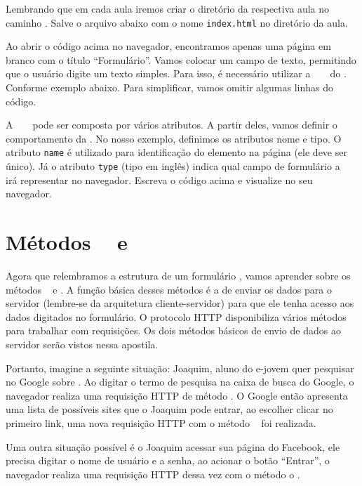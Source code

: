 

Lembrando que em cada aula iremos criar o diretório da respectiva aula no caminho
. Salve o arquivo abaixo com o nome \texttt{index.html} no
diretório da aula.



Ao abrir o código acima no navegador, encontramos apenas uma página em branco com o 
título ``Formulário''. Vamos colocar um campo de texto, permitindo que o usuário digite 
um texto simples. Para isso, é necessário utilizar a \tag~ \taginput~ do \html. Conforme 
exemplo abaixo. Para simplificar, vamos omitir algumas linhas do código.



A \tag~ \taginput~ pode ser composta por vários atributos. A partir deles, vamos definir o 
comportamento da \tag. No nosso exemplo, definimos os atributos nome e tipo. O atributo
\texttt{name} é utilizado para identificação do elemento na página (ele deve ser único). 
Já o atributo \texttt{type} (tipo em inglês) indica qual campo de formulário a \tag~ \taginput 
irá representar no navegador. Escreva o código acima e visualize no seu navegador.

\section{Métodos \metodoGET~ e \metodoPOST}
Agora que relembramos a estrutura de um formulário \html, vamos aprender sobre os métodos
\metodoGET~ e \metodoPOST. A função básica desses métodos é a de enviar os dados para 
o servidor (lembre-se da arquitetura cliente-servidor) para que ele tenha acesso aos 
dados digitados no formulário. O protocolo HTTP disponibiliza vários métodos para 
trabalhar com requisições. Os dois métodos básicos de envio de dados ao servidor serão 
vistos nessa apostila.

Portanto, imagine a seguinte situação: Joaquim, aluno do e-jovem quer pesquisar no Google 
sobre \php. Ao digitar o termo de pesquisa na caixa de busca do Google, o navegador realiza 
uma requisição HTTP de método \metodoGET. O Google então apresenta uma lista de possíveis 
sites que o Joaquim pode entrar, ao escolher clicar no primeiro link, uma nova requisição 
HTTP com o método \metodoGET~ foi realizada.

Uma outra situação possível é o Joaquim acessar sua página do Facebook, ele precisa digitar 
o nome de usuário e a senha, ao acionar o botão “Entrar”, o navegador realiza uma requisição 
HTTP dessa vez com o método o \metodoPOST.

